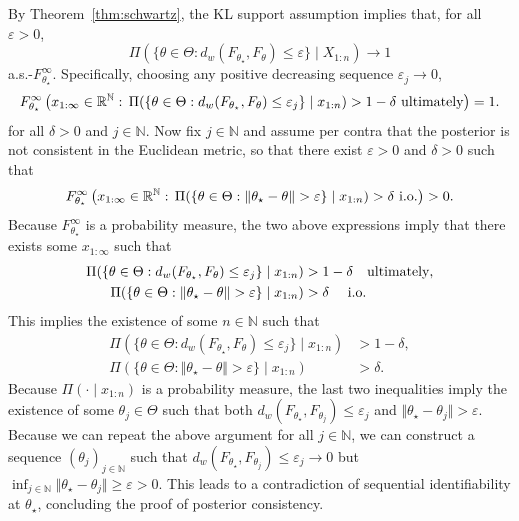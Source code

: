 \documentclass[11pt,twoside]{article}
\def\RR{\mathbb{R}}
\def\NN{\mathbb{N}}
\begin{document}
By Theorem~\ref{thm:schwartz}, the KL support assumption implies that, for all $\varepsilon>0$,
%
\begin{equation*}
    \Pi(\{\theta\in\Theta : d_w(F_{\theta_\star}, F_\theta) \leq  \varepsilon\} \mid X_{1:n}) \to 1
\end{equation*}
%
a.s.-$F_{\theta_\star}^\infty$. Specifically, choosing any positive decreasing sequence $\varepsilon_j\to 0$,
%
\begin{equation*}
    F_{\theta_\star}^\infty\left(x_{1:\infty}\in\RR^\NN:\, \Pi(\{\theta\in\Theta : d_w(F_{\theta_\star}, F_\theta) \leq  \varepsilon_j\} \mid x_{1:n}) > 1-\delta \textnormal{ ultimately}\right) = 1.
\end{equation*}
%
for all $\delta>0$ and $j\in\NN$. Now fix $j\in\NN$ and assume per contra that the posterior is not consistent in the Euclidean metric, so that there exist $\varepsilon>0$ and $\delta>0$ such that
%
\begin{equation*}
    F_{\theta_\star}^\infty\left(x_{1:\infty} \in\RR^\NN:\,\Pi(\{\theta\in\Theta : \Vert\theta_\star- \theta\Vert >  \varepsilon\} \mid x_{1:n}) > \delta \textnormal{ i.o.}\right) >0.
\end{equation*}
%
Because $F_{\theta_\star}^\infty$ is a probability measure, the two above expressions imply that there exists some $x_{1:\infty}$ such that
%
\begin{align*}
    \Pi(\{\theta\in\Theta : d_w(F_{\theta_\star}, F_\theta) \leq  \varepsilon_j\} \mid x_{1:n}) & > 1-\delta \quad \textnormal{ultimately}, \\
    \Pi(\{\theta\in\Theta : \Vert\theta_\star- \theta\Vert >  \varepsilon\} \mid x_{1:n}) &> \delta \quad \textnormal{ i.o.}
\end{align*}
%
This implies the existence of some $n\in\NN$ such that
%
\begin{align*}
    \Pi(\{\theta\in\Theta : d_w(F_{\theta_\star}, F_\theta) \leq  \varepsilon_j\} \mid x_{1:n}) & > 1-\delta, \\
    \Pi(\{\theta\in\Theta : \Vert\theta_\star- \theta\Vert >  \varepsilon\} \mid x_{1:n}) & > \delta.
\end{align*}
%
Because $\Pi(\cdot\mid x_{1:n})$ is a probability measure, the last two inequalities imply the existence of some $\theta_j\in\Theta$ such that both $d_w(F_{\theta_\star}, F_{\theta_j}) \leq  \varepsilon_j$ and $\Vert\theta_\star- \theta_j\Vert >  \varepsilon$. Because we can repeat the above argument for all $j\in\NN$, we can construct a sequence $(\theta_j)_{j\in\NN}$ such that $d_w(F_{\theta_\star}, F_{\theta_j}) \leq  \varepsilon_j\to 0$ but $\inf_{j\in\NN}\Vert\theta_\star- \theta_j\Vert \geq  \varepsilon>0$. This leads to a contradiction of sequential identifiability at $\theta_\star$, concluding the proof of posterior consistency.
\end{document}
